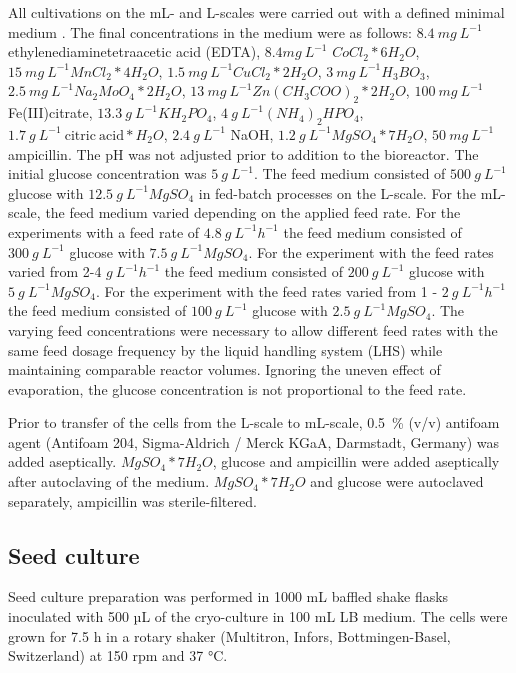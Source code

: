 \documentclass[sn-standardnature]{sn-jnl}%
\theoremstyle{thmstyleone}%
\theoremstyle{thmstyletwo}%
\theoremstyle{thmstylethree}%
\begin{document}
All cultivations on the mL- and L-scales were carried out with a defined minimal medium \cite{riesenberg1991high}.
The final concentrations in the medium were as follows:
$8.4\ mg\ L^{-1}$ ethylenediaminetetraacetic acid (EDTA), $8.4 mg\ L^{-1}$ $CoCl_{2}*6H_{2}O$, $15\ mg\ L^{-1} MnCl_{2}*4H_{2}O$, $1.5\ mg\ L^{-1} CuCl_{2}*2H_{2}O$, $3\ mg\ L^{-1} H_{3}BO_{3}$, $2.5\ mg\ L^{-1} Na_{2}MoO_{4}*2H_{2}O$, $13\ mg\ L^{-1} Zn(CH_{3}COO)_{2}*2H_{2}O$, $100\ mg\ L^{-1}$ Fe(III)citrate, $13.3\ g\ L^{-1} KH_{2}PO_{4}$, $4\ g\ L^{-1} (NH_{4})_{2}HPO_{4}$, $1.7\ g\ L^{-1}\ \mathrm{citric\ acid}*H_{2}O$, $2.4\ g\ L^{-1}$ NaOH, $1.2\ g\ L^{-1} MgSO_{4}*7H_{2}O$, $50\ mg\ L^{-1}$ ampicillin.
The pH was not adjusted prior to addition to the bioreactor.
The initial glucose concentration was $5\ g\ L^{-1}$.
The feed medium consisted of $500\ g\ L^{-1}$ glucose with $12.5\ g\ L^{-1} MgSO_{4}$ in fed-batch processes on the L-scale.
For the mL-scale, the feed medium varied depending on the applied feed rate.
For the experiments with a feed rate of $4.8\ g\ L^{-1} h^{-1}$ the feed medium consisted of $300\ g\ L^{-1}$ glucose with $7.5\ g\ L^{-1} MgSO_{4}$.
For the experiment with the feed rates varied from 2-4 $g\ L^{-1}h^{-1}$ the feed medium consisted of $200\ g\ L^{-1}$ glucose with $5\ g\ L^{-1} MgSO_{4}$.
For the experiment with the feed rates varied from 1 - $2\ g\ L^{-1} h^{-1}$ the feed medium consisted of $100\ g\ L ^{-1}$ glucose with $2.5\ g\ L^{-1} MgSO_{4}$.
The varying feed concentrations were necessary to allow different feed rates with the same feed dosage frequency by the liquid handling system (LHS) while maintaining comparable reactor volumes.
Ignoring the uneven effect of evaporation, the glucose concentration is not proportional to the feed rate.

Prior to transfer of the cells from the L-scale to mL-scale, 0.5~\% (v/v) antifoam agent (Antifoam 204, Sigma-Aldrich / Merck KGaA, Darmstadt, Germany) was added aseptically.
$MgSO_{4}*7H_{2}O$, glucose and ampicillin were added aseptically after autoclaving of the medium.
$MgSO_{4}*7H_{2}O$ and glucose were autoclaved separately, ampicillin was sterile-filtered.

\subsection{Seed culture}
Seed culture preparation was performed in 1000 mL baffled shake flasks inoculated with 500 µL of the cryo-culture in 100 mL LB medium.
The cells were grown for 7.5 h in a rotary shaker (Multitron, Infors, Bottmingen-Basel, Switzerland) at 150 rpm and 37 °C.
\end{document}
